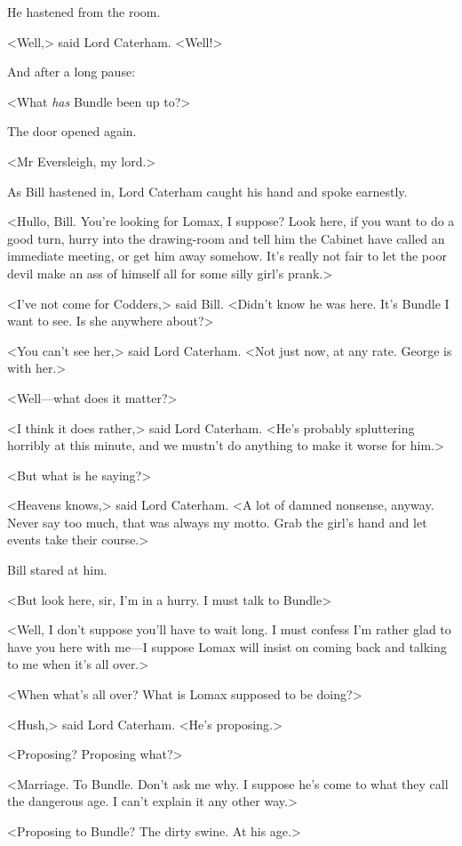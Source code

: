He hastened from the room.

<Well,> said Lord Caterham. <Well!>

And after a long pause:

<What \emph{has} Bundle been up to?>

The door opened again.

<Mr Eversleigh, my lord.>

As Bill hastened in, Lord Caterham caught his hand and spoke earnestly.

<Hullo, Bill. You're looking for Lomax, I suppose? Look here, if you want to do a good turn, hurry into the drawing-room and tell him the Cabinet have called an immediate meeting, or get him away somehow. It's really not fair to let the poor devil make an ass of himself all for some silly girl's prank.>

<I've not come for Codders,> said Bill. <Didn't know he was here. It's Bundle I want to see. Is she anywhere about?>

<You can't see her,> said Lord Caterham. <Not just now, at any rate. George is with her.>

<Well—what does it matter?>

<I think it does rather,> said Lord Caterham. <He's probably spluttering horribly at this minute, and we mustn't do anything to make it worse for him.>

<But what is he saying?>

<Heavens knows,> said Lord Caterham. <A lot of damned nonsense, anyway. Never say too much, that was always my motto. Grab the girl's hand and let events take their course.>

Bill stared at him.

<But look here, sir, I'm in a hurry. I must talk to Bundle\longdash>

<Well, I don't suppose you'll have to wait long. I must confess I'm rather glad to have you here with me—I suppose Lomax will insist on coming back and talking to me when it's all over.>

<When what's all over? What is Lomax supposed to be doing?>

<Hush,> said Lord Caterham. <He's proposing.>

<Proposing? Proposing what?>

<Marriage. To Bundle. Don't ask me why. I suppose he's come to what they call the dangerous age. I can't explain it any other way.>

<Proposing to Bundle? The dirty swine. At his age.>

